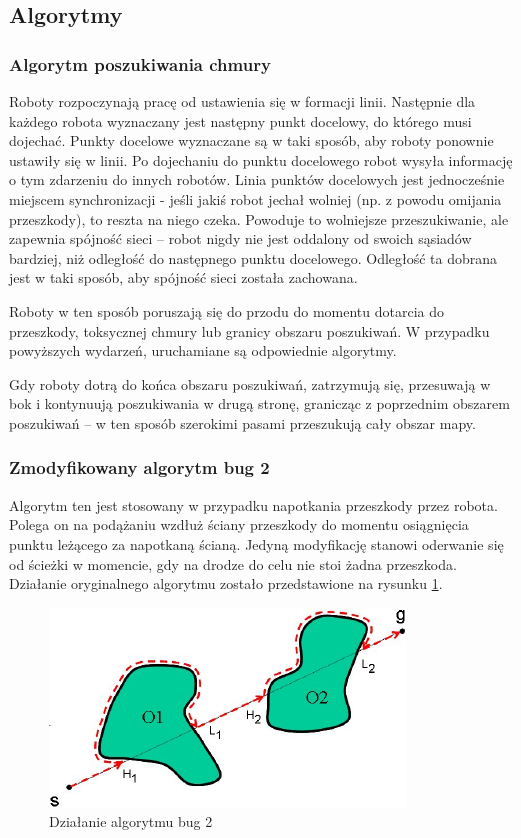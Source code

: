 \documentclass[a4paper, 12pt]{article}
\begin{document}
	
	\subsection{Algorytmy}
		
		\subsubsection{Algorytm poszukiwania chmury}
		Roboty rozpoczynają pracę od ustawienia się w formacji linii. Następnie dla każdego robota wyznaczany jest następny punkt docelowy, do którego musi dojechać. Punkty docelowe wyznaczane są w taki sposób, aby roboty ponownie ustawiły się w linii. Po dojechaniu do punktu docelowego robot wysyła informację o tym zdarzeniu do innych robotów. Linia punktów docelowych jest jednocześnie miejscem synchronizacji - jeśli jakiś robot jechał wolniej (np. z powodu omijania przeszkody), to reszta na niego czeka. Powoduje to wolniejsze przeszukiwanie, ale zapewnia spójność sieci -- robot nigdy nie jest oddalony od swoich sąsiadów bardziej, niż odległość do następnego punktu docelowego. Odległość ta dobrana jest w taki sposób, aby spójność sieci została zachowana.
		
		Roboty w ten sposób poruszają się do przodu do momentu dotarcia do przeszkody, toksycznej chmury lub granicy obszaru poszukiwań. W przypadku powyższych wydarzeń, uruchamiane są odpowiednie algorytmy.
		
		Gdy roboty dotrą do końca obszaru poszukiwań, zatrzymują się, przesuwają w bok i kontynuują poszukiwania w drugą stronę, granicząc z poprzednim obszarem poszukiwań -- w ten sposób szerokimi pasami przeszukują cały obszar mapy.
		
		\subsubsection{Zmodyfikowany algorytm bug 2}
		Algorytm ten jest stosowany w przypadku napotkania przeszkody przez robota. Polega on na podążaniu wzdłuż ściany przeszkody do momentu osiągnięcia punktu leżącego za napotkaną ścianą. Jedyną modyfikację stanowi oderwanie się od ścieżki w momencie, gdy na drodze do celu nie stoi żadna przeszkoda.  Działanie oryginalnego algorytmu zostało przedstawione na rysunku \ref{bug2_img}.
		\begin{figure}[h!]
			\centering
			\includegraphics*[width=0.7\columnwidth]{img/40-0.png}
			\caption{Działanie algorytmu bug 2}
			\label{bug2_img}
		\end{figure}
\end{document}
